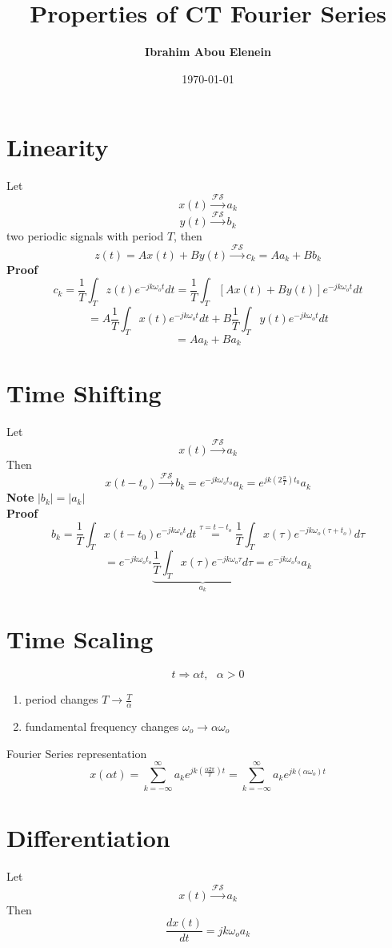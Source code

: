\documentclass[11pt,a4paper]{article}
\theoremstyle{definition}
\begin{document}
\author{\textbf{Ibrahim Abou Elenein}}
\title{\textbf{Properties of CT Fourier Series}}
\date {\today}
\maketitle
\section{Linearity}
Let 
\[
    x(t) \xrightarrow{\mathcal{F}\mathcal{S}} a_k
\]
\[
    y(t) \xrightarrow{\mathcal{F}\mathcal{S}} b_k
\]
two periodic signals with period $T$, then 
\[
    z(t) = Ax(t) + By(t) \xrightarrow{\mathcal{F}\mathcal{S}} c_k = Aa_k + Bb_k
\]
\textbf{Proof}
\[
    c_k = \frac{1}{T} \int_T z(t)e^{-jk\omega_ot} dt 
    = \frac{1}{T} \int_T [Ax(t) + By(t)]e^{-jk\omega_ot} dt
\]
\[
    = A \frac{1}{T} \int_T x(t)e^{-jk\omega_ot} dt + B \frac{1}{T} \int_T y(t) e^{-jk\omega_ot} dt
\]
\[
    = Aa_k+ Ba_k
\]
\section{Time Shifting}
Let 
\[
    x(t) \xrightarrow{\mathcal{F}\mathcal{S}} a_k
\]
Then 
\[
    x(t-t_o) \xrightarrow{\mathcal{F}\mathcal{S}} b_k = e^{-jk\omega_ot_o}a_k = e^{jk(2\frac{\pi}{T})t_0} a_k 
\]
\textbf{Note} $|b_k| = |a_k| $\\


\textbf{Proof}
\[
    b_k = \frac{1}{T} \int_T x(t-t_0) e^{-jk\omega_ot} dt \stackrel{\tau=t-t_o}{=} \frac{1}{T} \int_T 
    x(\tau) e^{-jk\omega_o(\tau+t_o)} d\tau
\]
\[
    = e^{-jk\omega_ot_o}  \underbrace{\frac{1}{T}\int_T x(\tau) e^{-jk\omega_o\tau} d\tau}_{a_k} = e^{-jk\omega_ot_o} a_k
\]
\section{Time Scaling}
\[
    t \Rightarrow \alpha t , \ \ \  \alpha > 0
\]
\begin{enumerate}
    \item period changes $T \rightarrow \frac{T}{\alpha} $
    \item fundamental frequency changes $\omega_o \rightarrow \alpha \omega_o $
\end{enumerate}
Fourier Series representation
\[
    \displaystyle x(\alpha t) = \sum_{k=-\infty}^{\infty} a_k e^{jk(\frac{\alpha 2 \pi}{T})t} =
    \sum_{k=-\infty}^{\infty} a_k e^{jk(\alpha \omega_o)t}
\]
\section{Differentiation}
Let 
\[
    x(t) \xrightarrow{\mathcal{F}\mathcal{S}} a_k
\]
Then 
\[
    \dfrac{dx(t)}{dt} = jk\omega_o a_k
\]
\end{document}
